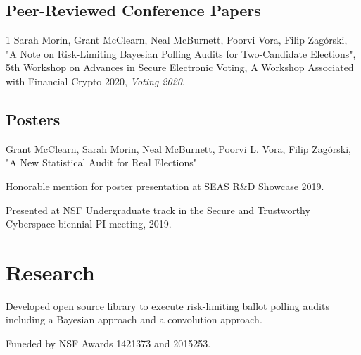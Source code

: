 \documentclass[]{deedy-resume-openfont}
\begin{document}
\begin{minipage}[t]{0.66\textwidth}
        \subsection{Peer-Reviewed Conference Papers}
        \vspace{\topsep}
        \begin{tightemize}
        \item[1] Sarah Morin, Grant McClearn, Neal McBurnett, Poorvi Vora, Filip Zag\'{o}rski, "A Note on Risk-Limiting Bayesian Polling Audits for Two-Candidate Elections", 5th Workshop on Advances in Secure Electronic Voting, A Workshop Associated with Financial Crypto 2020, \textit{Voting 2020}.
        \end{tightemize}
        \sectionsep
        \subsection{Posters}
        Grant McClearn, Sarah Morin, Neal McBurnett, Poorvi L. Vora, Filip Zag\'{o}rski, "A New Statistical Audit for Real Elections"
        \vspace{\topsep}
        \begin{tightemize}
                \item Honorable mention for poster presentation at SEAS R\&D Showcase 2019.\\
                \item Presented at NSF Undergraduate track in the Secure and Trustworthy Cyberspace biennial PI meeting, 2019.
        \end{tightemize}
        


        \section{Research}
        Developed open source library to execute risk-limiting ballot polling audits including a Bayesian approach and a convolution approach.
        
        \sectionsep
        Funeded by NSF Awards 1421373 and 2015253.


\end{minipage}
\end{document}
